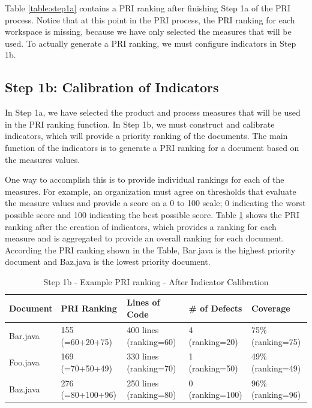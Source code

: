 Table \ref{table:step1a} contains a PRI ranking after finishing Step 1a of
the PRI process. Notice that at this point in the PRI process, the PRI
ranking for each workspace is missing, because we have only selected the
measures that will be used. To actually generate a PRI ranking, we must
configure indicators in Step 1b.


\subsection{Step 1b: Calibration of Indicators}
In Step 1a, we have selected the product and process measures that will be
used in the PRI ranking function. In Step 1b, we must construct and
calibrate indicators, which will provide a priority ranking of the
documents. The main function of the indicators is to generate a PRI ranking
for a document based on the measures values.

One way to accomplish this is to provide individual rankings for each of
the measures. For example, an organization must agree on thresholds that
evaluate the measure values and provide a score on a 0 to 100 scale; 0
indicating the worst possible score and 100 indicating the best possible
score. Table \ref{table:step1b-1} shows the PRI ranking after the creation
of indicators, which provides a ranking for each measure and is aggregated
to provide an overall ranking for each document. According the PRI ranking
shown in the Table, Bar.java is the highest priority document and Baz.java
is the lowest priority document.

\begin{table}[htbp]
  \caption{Step 1b - Example PRI ranking - After Indicator Calibration}
  \label{table:step1b-1}
  \begin{center}
    \begin{tabular}{|l|l|l|l|l|} \hline
      {\bf Document} & {\bf PRI Ranking} & {\bf Lines of Code} & 
      {\bf \# of Defects} & {\bf Coverage} \\ \hline
Bar.java & 155 {\footnotesize (=60+20+75)} & 400 lines  {\footnotesize
  (ranking=60)} & 4 {\footnotesize (ranking=20)} & 75\% {\footnotesize
  (ranking=75)} \\ \hline 

Foo.java & 169 {\footnotesize (=70+50+49)} & 330 lines {\footnotesize
  (ranking=70)} & 1 {\footnotesize (ranking=50)} & 49\% {\footnotesize
  (ranking=49)} \\ \hline 

Baz.java & 276 {\footnotesize (=80+100+96)} & 250 lines {\footnotesize
  (ranking=80)} & 0 {\footnotesize (ranking=100)} & 96\% {\footnotesize
  (ranking=96)} \\ \hline 
    \end{tabular}
  \end{center}
\end{table}

